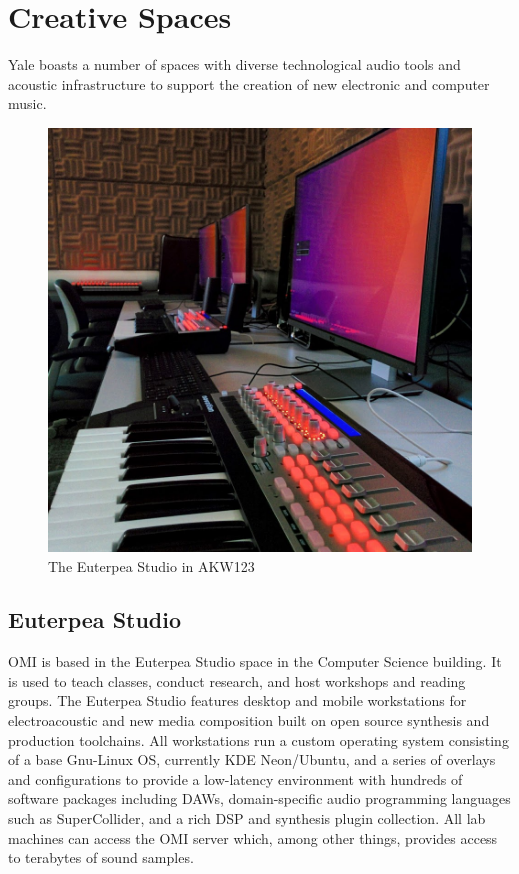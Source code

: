 \section{Creative Spaces}

Yale boasts a number of spaces with diverse technological audio tools and acoustic infrastructure to support the creation of new electronic and computer music.

\begin{figure}[h]
    \centering
    \includegraphics[width=0.85\columnwidth]{figs/euterpeastudio.png}
    \caption{The Euterpea Studio in AKW123}
    \label{fig:AKW123}
\end{figure}

\subsection{Euterpea Studio}
OMI is based in the Euterpea Studio space in the Computer Science building. It is used to teach classes, conduct research, and host workshops and reading groups. The Euterpea Studio features desktop and mobile workstations for electroacoustic and new media composition built on open source synthesis and production toolchains. All workstations run a custom operating system consisting of a base Gnu-Linux OS, currently KDE Neon/Ubuntu, and a series of overlays and configurations to provide a low-latency environment with hundreds of software packages including DAWs, domain-specific audio programming languages such as SuperCollider, and a rich DSP and synthesis plugin collection. All lab machines can access the OMI server which, among other things, provides access to terabytes of sound samples.

